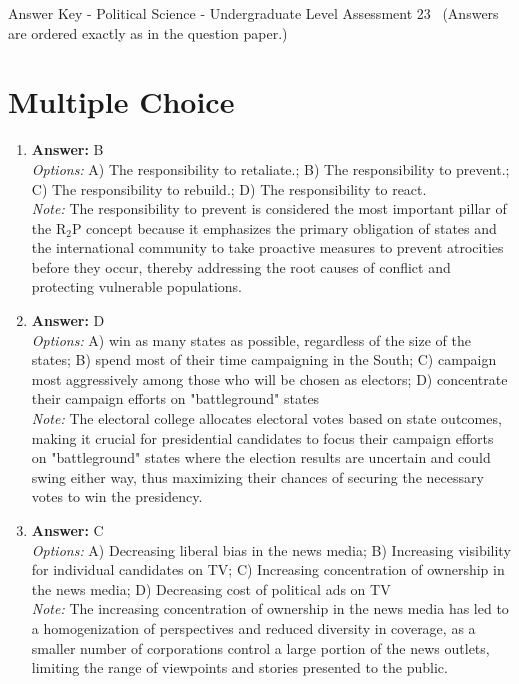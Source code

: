 \documentclass[12pt]{article}
\begin{document}
\begin{center}
Answer Key - Political Science - Undergraduate Level Assessment 23 \
\small (Answers are ordered exactly as in the question paper.)
\end{center}

\section*{Multiple Choice}
\begin{enumerate}[label=\arabic*.]
\item \textbf{Answer:} B
\\ \textit{Options:} A) The responsibility to retaliate.; B) The responsibility to prevent.; C) The responsibility to rebuild.; D) The responsibility to react.
\\ \textit{Note:} The responsibility to prevent is considered the most important pillar of the R$_{2}$P concept because it emphasizes the primary obligation of states and the international community to take proactive measures to prevent atrocities before they occur, thereby addressing the root causes of conflict and protecting vulnerable populations.
\item \textbf{Answer:} D
\\ \textit{Options:} A) win as many states as possible, regardless of the size of the states; B) spend most of their time campaigning in the South; C) campaign most aggressively among those who will be chosen as electors; D) concentrate their campaign efforts on "battleground" states
\\ \textit{Note:} The electoral college allocates electoral votes based on state outcomes, making it crucial for presidential candidates to focus their campaign efforts on "battleground" states where the election results are uncertain and could swing either way, thus maximizing their chances of securing the necessary votes to win the presidency.
\item \textbf{Answer:} C
\\ \textit{Options:} A) Decreasing liberal bias in the news media; B) Increasing visibility for individual candidates on TV; C) Increasing concentration of ownership in the news media; D) Decreasing cost of political ads on TV
\\ \textit{Note:} The increasing concentration of ownership in the news media has led to a homogenization of perspectives and reduced diversity in coverage, as a smaller number of corporations control a large portion of the news outlets, limiting the range of viewpoints and stories presented to the public.

\end{enumerate}
\end{document}
